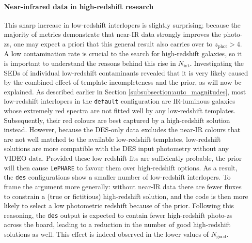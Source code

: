\paragraph{Near-infrared data in high-redshift research}
This sharp increase in low-redshift interlopers is slightly surprising; because the majority of metrics demonstrate that near-IR data strongly improves the photo-zs, one may expect a priori that this general result also carries over to $z_{\mathrm{phot}}>4$. A low contamination rate is crucial to the search for high-redshift galaxies, so it is important to understand the reasons behind this rise in $N_{\mathrm{int}}$. Investigating the SEDs of individual low-redshift contaminants revealed that it is very likely caused by the combined effect of template incompleteness and the prior, as will now be explained. As described earlier in Section \ref{subsubsection:auto_magnitudes}, most low-redshift interlopers in the \texttt{default} configuration are IR-luminous galaxies whose extremely red spectra are not fitted well by any low-redshift templates. Subsequently, their red colours are best captured by a high-redshift solution instead. However, because the DES-only data excludes the near-IR colours that are not well matched to the available low-redshift templates, low-redshift solutions are more compatible with the DES input photometry without any VIDEO data. Provided these low-redshift fits are sufficiently probable, the prior will then cause \texttt{LePHARE} to favour them over high-redshift options. As a result, the \texttt{des} configurations show a smaller number of low-redshift interlopers. To frame the argument more generally: without near-IR data there are fewer fluxes to constrain a (true or fictitious) high-redshift solution, and the code is then more likely to select a low photometric redshift because of the prior. Following this  reasoning, the  \texttt{des} output is expected to contain fewer high-redshift photo-zs across the board, leading to a reduction in the number of good high-redshift solutions as well. This effect is indeed observed in the lower values of $N_{\mathrm{good}}$. \par 

